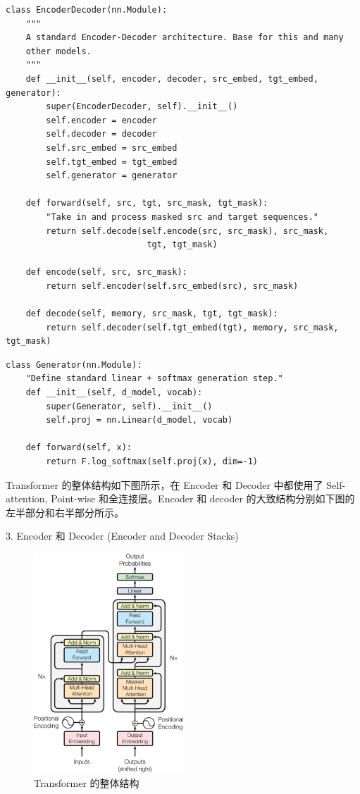 \begin{Verbatim}
class EncoderDecoder(nn.Module):
    """
    A standard Encoder-Decoder architecture. Base for this and many 
    other models.
    """
    def __init__(self, encoder, decoder, src_embed, tgt_embed, generator):
        super(EncoderDecoder, self).__init__()
        self.encoder = encoder
        self.decoder = decoder
        self.src_embed = src_embed
        self.tgt_embed = tgt_embed
        self.generator = generator
        
    def forward(self, src, tgt, src_mask, tgt_mask):
        "Take in and process masked src and target sequences."
        return self.decode(self.encode(src, src_mask), src_mask,
                            tgt, tgt_mask)
    
    def encode(self, src, src_mask):
        return self.encoder(self.src_embed(src), src_mask)
    
    def decode(self, memory, src_mask, tgt, tgt_mask):
        return self.decoder(self.tgt_embed(tgt), memory, src_mask, tgt_mask)
\end{Verbatim}

\begin{Verbatim}
class Generator(nn.Module):
    "Define standard linear + softmax generation step."
    def __init__(self, d_model, vocab):
        super(Generator, self).__init__()
        self.proj = nn.Linear(d_model, vocab)

    def forward(self, x):
        return F.log_softmax(self.proj(x), dim=-1)
\end{Verbatim}

Transformer 的整体结构如下图所示，在 Encoder 和 Decoder 中都使用了 Self-attention, Point-wise 和全连接层。Encoder 和 decoder 的大致结构分别如下图的左半部分和右半部分所示。

3. Encoder 和 Decoder (Encoder and Decoder Stacks)

\begin{figure}[htb]
\centering 
\includegraphics[width=0.5\textwidth]{img/n1.png} 
\caption{Transformer 的整体结构}
\label{Test}
\end{figure}

